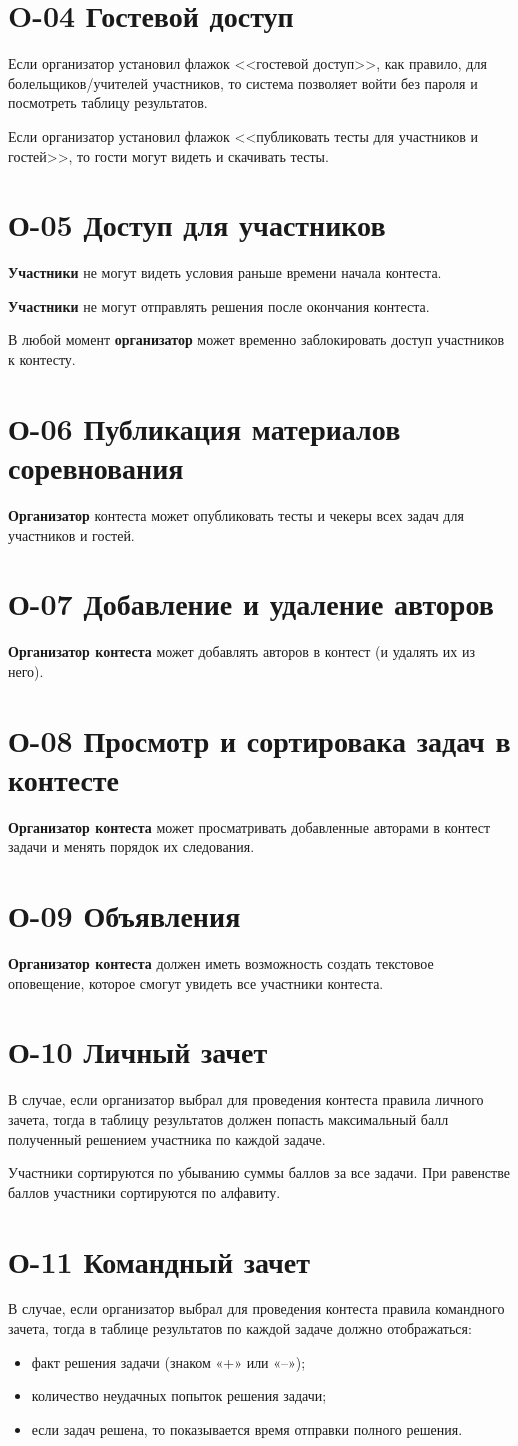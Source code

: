 \documentclass{book}
\newcommand{\newcard}[1]{\newpage \section*{#1}}
\begin{document}
\newcard{O-04 Гостевой доступ}
	Если организатор установил флажок <<гостевой доступ>>, как правило, для болельщиков/учителей участников, то система позволяет войти без пароля и посмотреть таблицу результатов.
	
	Если организатор установил флажок <<публиковать тесты для участников и гостей>>, то гости могут видеть и скачивать тесты.


\newcard{О-05 Доступ для участников}
	\textbf{Участники} не могут видеть условия раньше времени начала контеста. 
	
	\textbf{Участники} не могут отправлять решения после окончания контеста. 
	
	В любой момент \textbf{организатор} может временно заблокировать доступ участников к контесту. 


\newcard{О-06 Публикация материалов соревнования}
	\textbf{Организатор} контеста может опубликовать тесты и чекеры всех задач для участников и гостей.


\newcard{О-07 Добавление и удаление авторов}
	\textbf{Организатор контеста} может добавлять авторов в контест (и удалять их из него). 


\newcard{О-08 Просмотр и сортировака задач в контесте}
	\textbf{Организатор контеста} может просматривать добавленные авторами в контест задачи и менять порядок их следования.


\newcard{О-09 Объявления}
	\textbf{Организатор контеста} должен иметь возможность создать текстовое оповещение, которое смогут увидеть все участники контеста.


\newcard{О-10 Личный зачет}
	В случае, если организатор выбрал для проведения контеста правила личного зачета, тогда в таблицу результатов должен попасть максимальный балл полученный решением участника по каждой задаче.

	Участники сортируются по убыванию суммы баллов за все задачи. При равенстве баллов участники сортируются по алфавиту.


\newcard{О-11 Командный зачет}
	В случае, если организатор выбрал для проведения контеста правила командного зачета, тогда в таблице результатов по каждой задаче должно отображаться:
	\begin{itemize}
	\item факт решения задачи (знаком «+» или «­–»);
	\item количество неудачных попыток решения задачи;
	\item если задач решена, то показывается время отправки полного решения.
	\end{itemize}
	
\end{document}
